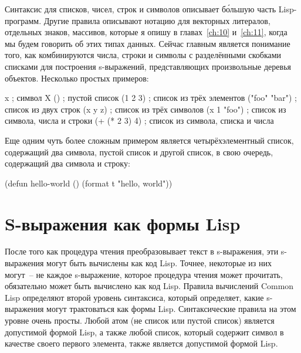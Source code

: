 Синтаксис для списков, чисел, строк и символов описывает б\'{о}льшую часть Lisp-программ.
Другие правила описывают нотацию для векторных литералов, отдельных знаков, массивов,
которые я опишу в главах~\ref{ch:10} и~\ref{ch:11}, когда мы будем говорить об этих типах
данных. Сейчас главным является понимание того, как комбинируются числа, строки и символы
с разделёнными скобками списками для построения s-выражений, представляющих произвольные
деревья объектов. Несколько простых примеров:

\begin{myverb}
x             ; символ X
()            ; пустой список
(1 2 3)       ; список из трёх элементов
("foo" "bar") ; список из двух строк
(x y z)       ; список из трёх символов
(x 1 "foo")   ; список из символа, числа и строки
(+ (* 2 3) 4) ; список из символа, списка и числа
\end{myverb}

Еще одним чуть более сложным примером является четырёхэлементный список, содержащий два
символа, пустой список и другой список, в свою очередь, содержащий два символа и строку:

\begin{myverb}
(defun hello-world ()
  (format t "hello, world"))
\end{myverb}

\section{S-выражения как формы Lisp}

После того как процедура чтения преобразовывает текст в s-выражения, эти s-выражения
могут быть вычислены как код Lisp. Точнее, некоторые из них могут~-- не каждое s-выражение,
которое процедура чтения может прочитать, обязательно может быть вычислено как код
Lisp. Правила вычислений Common Lisp определяют второй уровень синтаксиса, который
определяет, какие s-выражения могут трактоваться как формы Lisp. Синтаксические правила на этом уровне очень просты. Любой атом (не список или
пустой список) является допустимой формой Lisp, а также любой список, который содержит
символ в качестве своего первого элемента, также является до\-пус\-ти\-мой формой
Lisp.

